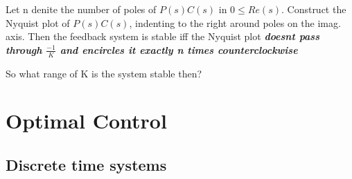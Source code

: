 \documentclass[11pt, a4paper]{article} %
\begin{document}
Let n denite the number of poles of $ P(s)C(s) $ in $ 0 \leq Re(s) $. Construct the Nyquist plot of $ P(s)C(s) $, indenting to the right around poles on the imag. axis. Then the feedback system is stable iff the Nyquist plot \textbf{\textit{doesnt pass through $ \frac{-1} {K}  $ and encircles it exactly n times counterclockwise}}  

So what range of K is the system stable then?



\section{Optimal Control}


\subsection{Discrete time systems}
\end{document}
